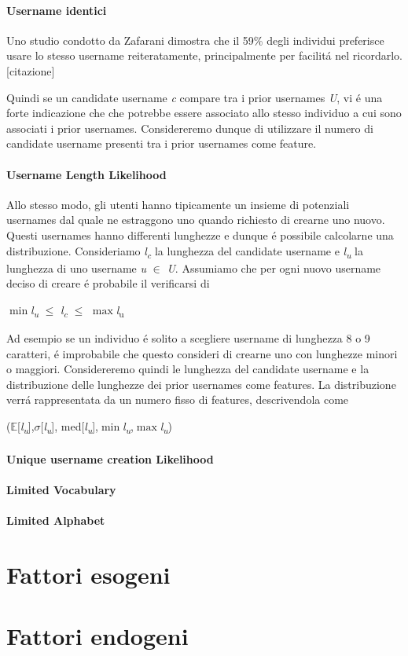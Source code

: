 \paragraph{Username identici}
Uno studio condotto da Zafarani dimostra che il 59\% degli individui preferisce usare lo stesso username reiteratamente, principalmente per facilitá nel ricordarlo.[citazione]

Quindi se un candidate username \textit{c} compare tra i prior usernames \textit{U}, vi é una forte indicazione che che potrebbe essere associato allo stesso individuo a cui sono associati i prior usernames. Considereremo dunque di utilizzare il numero di candidate username presenti tra i prior usernames come feature.

\paragraph{Username Length Likelihood}
Allo stesso modo, gli utenti hanno tipicamente un insieme di potenziali usernames dal quale ne estraggono uno quando richiesto di crearne uno nuovo. Questi usernames hanno differenti lunghezze e dunque é possibile calcolarne una distribuzione. Consideriamo \textit{l\textsubscript{c}} la lunghezza del candidate username e \textit{l\textsubscript{u}} la lunghezza di uno username \textit{u} $\in$ \textit{U}.
Assumiamo che per ogni nuovo username deciso di creare é probabile il verificarsi di\\
\centerline{$\min$\textit{l\textsubscript{u}} $\leq$ \textit{l\textsubscript{c}} $\leq$ $\max$\textit{l}\textsubscript{u}}
Ad esempio se un individuo é solito a scegliere username di lunghezza 8 o 9 caratteri, é improbabile che questo consideri di crearne uno con lunghezze minori o maggiori.
Considereremo quindi le lunghezza del candidate username e la distribuzione delle lunghezze dei prior usernames come features. La distribuzione verrá rappresentata da un numero fisso di features, descrivendola come\\
\centerline{($\mathbb{E}$[\textit{l\textsubscript{u}}],$\sigma$[\textit{l\textsubscript{u}}], med[\textit{l\textsubscript{u}}],$\min$\textit{l\textsubscript{u}},$\max$\textit{l\textsubscript{u}})}

\paragraph{Unique username creation Likelihood}

\paragraph{Limited Vocabulary}

\paragraph{Limited Alphabet}


\section{Fattori esogeni}
\section{Fattori endogeni}
